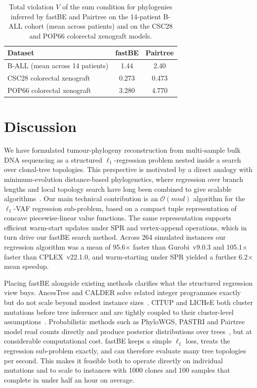 \documentclass[11pt]{article}
\begin{document}
\begin{table}[htbp]
\centering
\caption{Total violation $V$ of the sum condition for phylogenies inferred by fastBE and Pairtree on the 14-patient B-ALL cohort (mean across patients) and on the CSC28 and POP66 colorectal xenograft models.}
\label{tab:violation}
\begin{tabular}{lcc}
\toprule
Dataset & fastBE & Pairtree \\
\midrule
B-ALL (mean across 14 patients) & 1.44 & 2.40 \\
CSC28 colorectal xenograft      & 0.273 & 0.473 \\
POP66 colorectal xenograft      & 3.280 & 4.770 \\
\bottomrule
\end{tabular}
\end{table}

\section{Discussion}
\label{sec:discussion}

We have formulated tumour-phylogeny reconstruction from multi-sample bulk DNA sequencing as a structured $\ell_1$-regression problem nested inside a search over clonal-tree topologies. This perspective is motivated by a direct analogy with minimum-evolution distance-based phylogenetics, where regression over branch lengths and local topology search have long been combined to give scalable algorithms~\citep{desper2002fastme,lefort2015fastme,price2010fasttree}. Our main technical contribution is an $\mathcal{O}(mnd)$ algorithm for the $\ell_1$-VAF regression sub-problem, based on a compact tuple representation of concave piecewise-linear value functions. The same representation supports efficient warm-start updates under SPR and vertex-append operations, which in turn drive our fastBE search method. Across 264 simulated instances our regression algorithm was a mean of 95.6$\times$ faster than Gurobi~v9.0.3 and 105.1$\times$ faster than CPLEX~v22.1.0, and warm-starting under SPR yielded a further 6.2$\times$ mean speedup.

Placing fastBE alongside existing methods clarifies what the structured regression view buys. AncesTree and CALDER solve related integer programmes exactly but do not scale beyond modest instance sizes~\citep{elkebir2015reconstruction,myers2019calder}. CITUP and LICHeE both cluster mutations before tree inference and are tightly coupled to their cluster-level assumptions~\citep{malikic2015citup,popic2015lichee}. Probabilistic methods such as PhyloWGS, PASTRI and Pairtree model read counts directly and produce posterior distributions over trees~\citep{deshwar2015phylowgs,satas2017pastri,wintersinger2022pairtree}, but at considerable computational cost. fastBE keeps a simple $\ell_1$ loss, treats the regression sub-problem exactly, and can therefore evaluate many tree topologies per second. This makes it feasible both to operate directly on individual mutations and to scale to instances with 1000 clones and 100 samples that complete in under half an hour on average.
\end{document}

